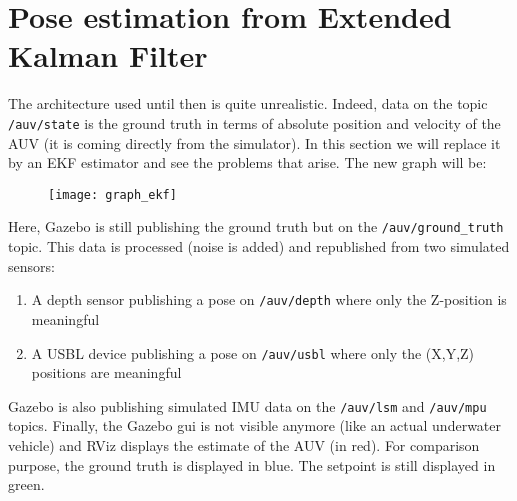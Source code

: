 \documentclass{ecnreport}
\begin{document}
%
%
%

%

\section{Pose estimation from Extended Kalman Filter}

The architecture used until then is quite unrealistic.
Indeed, data on the topic \texttt{/auv/state} is the ground truth in terms of absolute position and velocity of the AUV (it is coming
directly from the simulator).
In this section we will replace it by an EKF estimator and see the problems that arise. The new graph will be:
\begin{figure}[h]\centering
 \texttt{[image: graph\_ekf]}
\end{figure}

Here, Gazebo is still publishing the ground truth but on the \texttt{/auv/ground\_truth} topic. This data is processed (noise is added) and republished from two simulated sensors:
\begin{enumerate}
  \item A depth sensor publishing a pose on \texttt{/auv/depth} where only the Z-position is meaningful
  \item A USBL device publishing a pose on \texttt{/auv/usbl} where only the (X,Y,Z) positions are meaningful
\end{enumerate}
Gazebo is also publishing simulated IMU data on the \texttt{/auv/lsm} and \texttt{/auv/mpu} topics. 
Finally, the Gazebo gui is not visible anymore (like an actual underwater vehicle) and RViz displays the estimate of the AUV (in red). 
For comparison purpose, the ground truth is displayed in blue. The setpoint is still displayed in green.
\end{document}
